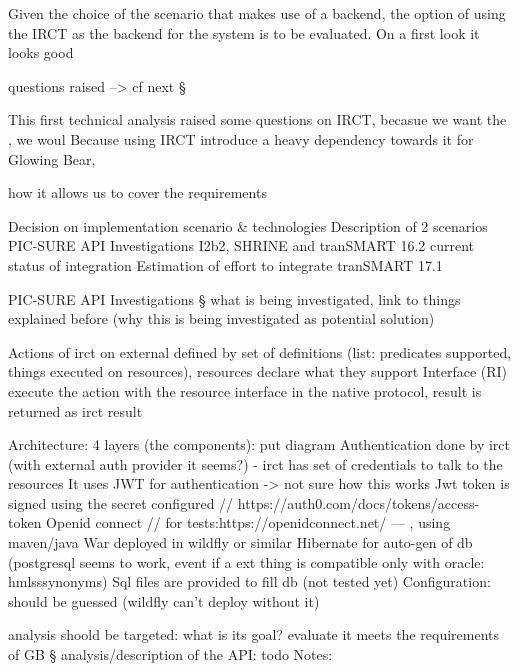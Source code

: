 Given the choice of the scenario that makes use of a backend, the option of using the IRCT as the backend for the system is to be evaluated.
On a first look it looks good 

questions raised --> cf next §

This first technical analysis raised some questions on IRCT, becasue we want the , we woul
Because using IRCT introduce a heavy dependency towards it for Glowing Bear, 


how it allows us to cover the requirements


Decision on implementation scenario \& technologies
Description of 2 scenarios
PIC-SURE API Investigations
I2b2, SHRINE and tranSMART 16.2 current status of integration
Estimation of effort to integrate tranSMART 17.1


PIC-SURE API Investigations
§ what is being investigated, link to things explained before (why this is being investigated as potential solution)

Actions of irct on external defined by set of definitions (list: predicates supported, things executed on resources), resources declare what they support
Interface (RI) execute the action with the resource interface in the native protocol, result is returned as irct result

Architecture: 4 layers (the components): put diagram
Authentication done by irct (with external auth provider it seems?) - irct has set of credentials to talk to the resources 
It uses JWT for authentication -> not sure how this works
Jwt token is signed using the secret configured // https://auth0.com/docs/tokens/access-token
Openid connect // for tests:https://openidconnect.net/
---
, using maven/java
War deployed in wildfly or similar
Hibernate for auto-gen of db (postgresql seems to work, event if a ext thing is compatible only with oracle: hmlsssynonyms)
Sql files are provided to fill db (not tested yet)
Configuration: should be guessed (wildfly can’t deploy without it)


analysis shoold be targeted: what is its goal? evaluate it meets the requirements of GB
§ analysis/description of the API: todo %
Notes:

